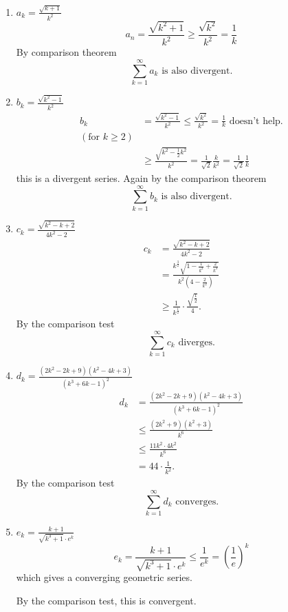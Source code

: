 \documentclass[10pt, a4paper]{article}
\newcommand{\infsum}[1][k = 1]{\sum_{#1}^{\infty}}
\begin{document}
\begin{example}\phantom{}
    \begin{enumerate}[label = \alph*)]
        \item $a_k = \frac{\sqrt{k + 1}}{k ^ 2}$
        \[
        a_n = \frac{\sqrt{k ^ 2 + 1}}{k ^ 2} \geq \frac{\sqrt{k ^ 2}}{k ^ 2} = \frac{1}{k}
        \]
        By comparison theorem
        \[
        \infsum a_k\text{ is also divergent}.
        \]
        \item $b_k = \frac{\sqrt{k ^ 2 - 1}}{k ^ 2}$
        \begin{align*}
        b_k &= \frac{\sqrt{k ^ 2 - 1}}{k ^ 2} \leq \frac{\sqrt{k ^ 2}}{k ^ 2} = \frac{1}{k}\text{ doesn't help.} \\
        (\text{for $k \geq 2$}) \\
        &\geq \frac{\sqrt{k ^ 2 - \frac{1}{2}k ^ 2}}{k ^ 2} = \frac{1}{\sqrt{2}} \frac{k}{k ^ 2} = \frac{1}{\sqrt{2}}\frac{1}{k}
        \end{align*}
        this is a divergent series.
        Again by the comparison theorem
        \[
        \infsum b_k \text{ is also divergent}.
        \]
        \item $c_k = \frac{\sqrt{k ^ 2 - k + 2}}{4k ^ 2 - 2}$
        \begin{align*}
            c_k &= \frac{\sqrt{k ^ 2 - k + 2}}{4k ^ 2 - 2} \\
            &= \frac{k ^ {\frac{3}{2}}\sqrt{1 - \frac{1}{k ^ 2} + \frac{2}{k ^ 3}}}{k ^ 2\left(4 - \frac{2}{k ^ 2}\right)} \\
            &\geq \frac{1}{k ^ {\frac{1}{2}}} \cdot \frac{\sqrt{\frac{1}{2}}}{4}.
        \end{align*}
        By the comparison test
        \[
        \infsum c_k\text{ diverges}.
        \]
        \item $d_k = \frac{(2k ^ 2 - 2k + 9)(k ^ 2 - 4k + 3)}{(k ^ 3 + 6k - 1) ^ 2}$
        \begin{align*}
            d_k &= \frac{(2k ^ 2 - 2k + 9)(k ^ 2 - 4k + 3)}{(k ^ 3 + 6k - 1) ^ 2} \\
            &\leq \frac{(2k ^ 2 + 9)(k ^ 2 + 3)}{k ^ 6} \\
            &\leq \frac{11k ^ 2 \cdot 4k ^ 2}{k ^ 6} \\
            &= 44 \cdot \frac{1}{k ^ 2}.
        \end{align*}
        By the comparison test
        \[
        \infsum d_k\text{ converges}.
        \]
        \item $e_k = \frac{k + 1}{\sqrt{k ^ 3 + 1} \cdot e ^ k}$
        \[
        e_k = \frac{k + 1}{\sqrt{k ^ 3 + 1}\cdot e ^ k} \leq \frac{1}{e ^ k} = \left(\frac{1}{e}\right) ^ k
        \]
        which gives a converging geometric series.

        By the comparison test,
        this is convergent.
    \end{enumerate}
\end{example}
\end{document}
